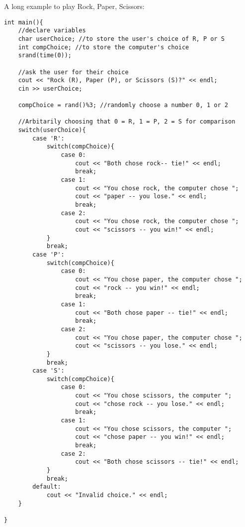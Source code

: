 \begin{example}
    A long example to play Rock, Paper, Scissors:

    \begin{verbatim}
int main(){
    //declare variables
    char userChoice; //to store the user's choice of R, P or S
    int compChoice; //to store the computer's choice
    srand(time(0));

    //ask the user for their choice
    cout << "Rock (R), Paper (P), or Scissors (S)?" << endl;
    cin >> userChoice;

    compChoice = rand()%3; //randomly choose a number 0, 1 or 2

    //Arbitarily choosing that 0 = R, 1 = P, 2 = S for comparison
    switch(userChoice){
        case 'R':
            switch(compChoice){
                case 0: 
                    cout << "Both chose rock-- tie!" << endl;
                    break;
                case 1:
                    cout << "You chose rock, the computer chose ";
                    cout << "paper -- you lose." << endl;
                    break;
                case 2:
                    cout << "You chose rock, the computer chose ";
                    cout << "scissors -- you win!" << endl;
            }
            break;
        case 'P':
            switch(compChoice){
                case 0: 
                    cout << "You chose paper, the computer chose ";
                    cout << "rock -- you win!" << endl;
                    break;
                case 1:
                    cout << "Both chose paper -- tie!" << endl;
                    break;
                case 2:
                    cout << "You chose paper, the computer chose ";
                    cout << "scissors -- you lose." << endl;
            }
            break;
        case 'S':
            switch(compChoice){
                case 0: 
                    cout << "You chose scissors, the computer "; 
                    cout << "chose rock -- you lose." << endl;
                    break;
                case 1:
                    cout << "You chose scissors, the computer "; 
                    cout << "chose paper -- you win!" << endl;
                    break;
                case 2:
                    cout << "Both chose scissors -- tie!" << endl;
            }
            break;
        default:
            cout << "Invalid choice." << endl;
    }

}

    \end{verbatim}
\end{example}

